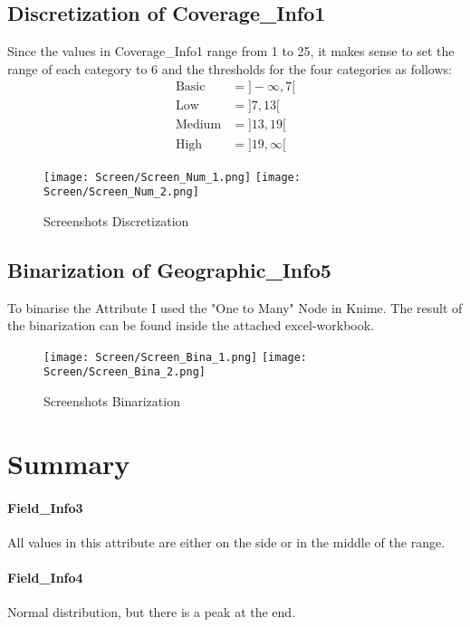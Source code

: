 \subsection{Discretization of Coverage\_Info1}
Since the values in Coverage\_Info1 range from 1 to 25, it makes sense to set the range of each category to $6$ and the thresholds for the four categories as follows:
\begin{align*}
\text{Basic} &= ]-\infty , 7[\\
\text{Low} &= ]7 , 13[\\
\text{Medium} &= ]13 , 19[\\
\text{High} &= ]19 , \infty[
\end{align*}
\begin{figure}[H]
	\begin{center}
		\texttt{[image: Screen/Screen\_Num\_1.png]}
		\texttt{[image: Screen/Screen\_Num\_2.png]}	
	\end{center}
	\caption{Screenshots Discretization}
\end{figure}
\subsection{Binarization of Geographic\_Info5}
To binarise the Attribute I used the "One to Many" Node in Knime. The result of the binarization can be found inside the attached excel-workbook.
\begin{figure}[H]
	\begin{center}
		\texttt{[image: Screen/Screen\_Bina\_1.png]}
		\texttt{[image: Screen/Screen\_Bina\_2.png]}
		
	\end{center}
	\caption{Screenshots Binarization}
\end{figure}
\section{Summary}

\paragraph{Field\_Info3} All values in this attribute are either on the side or in the middle of the range. 

\paragraph{Field\_Info4} Normal distribution, but there is a peak at the end.

